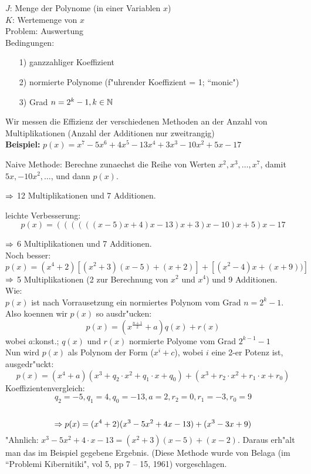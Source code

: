 \documentclass[a4paper,twoside,DIV15,BCOR12mm]{scrbook}
\begin{document}
$J$: Menge der Polynome (in einer Variablen $x$)\\
$K$: Wertemenge von $x$\\

Problem: Auswertung\\

Bedingungen: 
\begin{itemize}
\item[1)] ganzzahliger Koeffizient
\item[2)] normierte Polynome (f"uhrender Koeffizient = 1; ``monic")
\item[3)] Grad $n=2^k-1, k \in \mathbb{N}$
\end{itemize}

Wir messen die Effizienz der verschiedenen Methoden an der Anzahl von Multiplikationen (Anzahl der Additionen nur zweitrangig)\\

\textbf{Beispiel:} $p(x)=x^7-5x^6+4x^5-13x^4+3x^3-10x^2+5x-17$

Naive Methode: Berechne zunaechst die Reihe von Werten $x^2,x^3,\dots,x^7$, damit $5x,-10x^2,\dots$, und dann $p(x)$.

$\Rightarrow$ 12 Multiplikationen und 7 Additionen.

leichte Verbesserung: $$p(x)=((((((x-5)x+4)x-13)x+3)x-10)x+5)x-17$$	

$\Rightarrow$ 6 Multiplikationen und 7 Additionen.\\

Noch besser: 
$$p(x)=(x^4+2)[(x^2+3)(x-5)+(x+2)]+[(x^2-4)x+(x+9))]$$
$\Rightarrow$ 5 Multiplikationen (2 zur Berechnung von $x^2$ und $x^4$) und 9 Additionen.\\

Wie:\\
$p(x)$ ist nach Vorrausetzung ein normiertes Polynom vom Grad $n=2^k-1$. Also koennen wir $p(x)$ so ausdr"ucken:
	$$p(x)=(x^{\frac{n+1}{2}}+a)q(x)+r(x)$$
wobei $a$:konst.; $q(x)$ und $r(x)$ normierte Polyome vom Grad $2^{k-1}-1$\\
Nun wird $p(x)$ als Polynom der Form ($x^i+c$), wobei $i$ eine 2-er Potenz ist, ausgedr"uckt:
$$p(x)=(x^4+a)(x^3+q_2\cdot x^2+q_1\cdot x+q_0)+(x^3+r_2\cdot x^2+r_1\cdot x+r_0)$$
Koeffizientenvergleich:
$$q_2=-5, q_1=4,q_0=-13,a=2,r_2=0,r_1=-3,r_0=9$$\\
$$\Rightarrow p(x)=(x^4+2)(x^3-5x^2+4x-13)+(x^3-3x+9)$$
"Ahnlich: $x^3-5x^2+4\cdot x-13=(x^2+3)(x-5)+(x-2)$. Daraus erh"alt man das im Beispiel gegebene Ergebnis.
(Diese Methode wurde von Belaga (im ``Problemi Kibernitiki", vol 5, pp 7 -- 15, 1961) vorgeschlagen.
\end{document}
